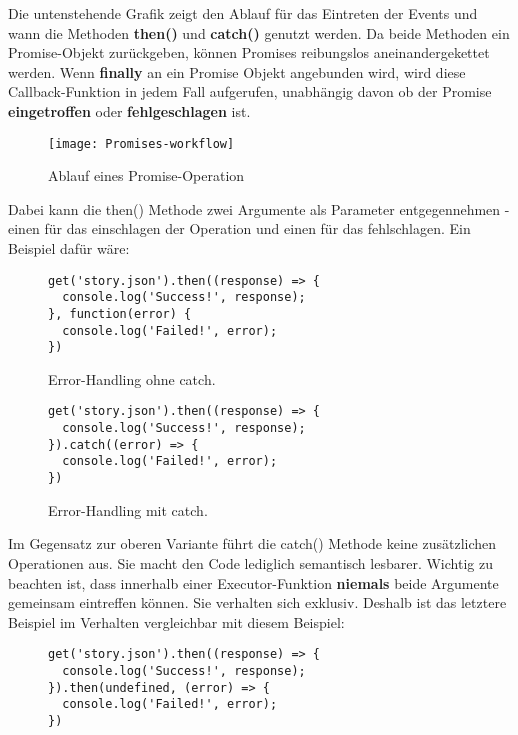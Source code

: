 \noindent
Die untenstehende Grafik zeigt den Ablauf für das Eintreten der Events und wann die Methoden \textbf{then()} und \textbf{catch()} genutzt werden. Da beide Methoden ein Promise-Objekt zurückgeben, können Promises reibungslos aneinandergekettet werden. Wenn \textbf{finally} an ein Promise Objekt angebunden wird, wird diese Callback-Funktion in jedem Fall aufgerufen,  unabhängig davon ob der Promise \textbf{eingetroffen} oder \textbf{fehlgeschlagen} ist.


\begin{figure}[H]
\texttt{[image: Promises-workflow]}
\caption{Ablauf eines Promise-Operation \cite{promise-executor}}
\end{figure}

\noindent
Dabei kann die then() Methode zwei Argumente als Parameter entgegennehmen - einen für das einschlagen der Operation und einen für das fehlschlagen. Ein Beispiel dafür wäre:

\begin{figure}[H]
\begin{lstlisting}
get('story.json').then((response) => {
  console.log('Success!', response);
}, function(error) {
  console.log('Failed!', error);
})
\end{lstlisting}
\caption{Error-Handling ohne catch. \cite{callback-vs-promises}}
\end{figure}

\begin{figure}[H]
\begin{lstlisting}
get('story.json').then((response) => {
  console.log('Success!', response);
}).catch((error) => {
  console.log('Failed!', error);
})
\end{lstlisting}
\caption{Error-Handling mit catch. \cite{callback-vs-promises}}
\end{figure}

\noindent
Im Gegensatz zur oberen Variante führt die catch() Methode keine zusätzlichen Operationen aus. Sie macht den Code lediglich semantisch lesbarer. Wichtig zu beachten ist, dass innerhalb einer Executor-Funktion \textbf{niemals} beide Argumente gemeinsam eintreffen können. Sie verhalten sich exklusiv. Deshalb ist das letztere Beispiel im Verhalten vergleichbar mit diesem Beispiel:

\begin{figure}[H]
\begin{lstlisting}
get('story.json').then((response) => {
  console.log('Success!', response);
}).then(undefined, (error) => {
  console.log('Failed!', error);
})
\end{lstlisting}
\end{figure}

